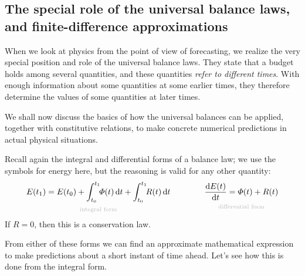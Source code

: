 \documentclass[a4paper,12pt,%
onecolumn,oneside,titlepage,%
british%
]{memoir}
\newcommand*{\di}{\mathrm{d}}%
\renewcommand*{\|}[1][]{\nonscript\:#1\vert\nonscript\:\mathopen{}}
\newcommand*{\yE}{E}
\newcommand*{\yH}{\varPhi}%
\newcommand*{\yR}{R}%
\newcommand*{\yti}{t_{0}}
\newcommand*{\ytf}{t_{1}}
\begin{document}
\subsection{The special role of the universal balance laws, and finite-difference approximations}
\label{sec:forecast_balances}

When we look at physics from the point of view of forecasting, we realize the very special position and role of the universal balance laws. They state that a budget holds among several quantities, and these quantities \emph{refer to different times}. With enough information about some quantities at some earlier times, they therefore determine the values of some quantities at later times.

We shall now discuss the basics of how the universal balances can be applied, together with constitutive relations, to make concrete numerical predictions in actual physical situations.

\smallskip


Recall again the integral and differential forms of a balance law; we use the symbols for energy here, but the reasoning is valid for any other quantity:
\begin{equation*}
      \underbracket[0pt]{\yE(\ytf) = \yE(\yti) + \int_{\yti}^{\ytf}\!\!\yH(t)\,\di t + \int_{\yti}^{\ytf}\!\!\yR(t)\,\di t}_{\mathclap{\text{\color{grey}integral form}}}
      \qquad%
      \qquad
      \underbracket[0pt]{\frac{\di\yE(t)}{\di t} = \yH(t) + \yR(t)}_{\mathclap{\text{\color{grey}differential form}}}
\end{equation*}
If $\yR=0$, then this is a conservation law.

From either of these forms we can find an approximate mathematical expression to make predictions about a short instant of time ahead. Let's see how this is done from the integral form.
\end{document}
